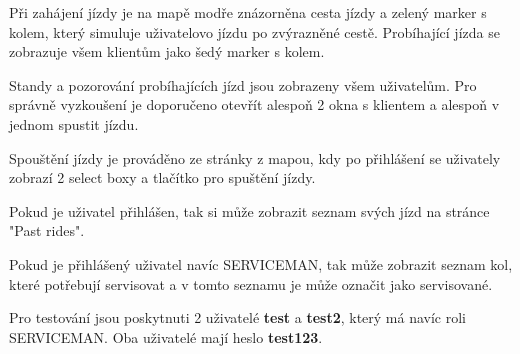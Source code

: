 \documentclass[12pt, letterpaper]{article}
\begin{document}
Při zahájení jízdy je na mapě modře znázorněna cesta jízdy a zelený marker s kolem, který simuluje uživatelovo jízdu
po zvýrazněné cestě. Probíhající jízda se zobrazuje všem klientům jako šedý marker s kolem.

Standy a pozorování probíhajících jízd jsou zobrazeny všem uživatelům. Pro správně vyzkoušení je doporučeno
otevřít alespoň 2 okna s klientem a alespoň v jednom spustit jízdu.

Spouštění jízdy je prováděno ze stránky z mapou, kdy po přihlášení se uživately zobrazí 2 select boxy a tlačítko pro
spuštění jízdy.

Pokud je uživatel přihlášen, tak si může zobrazit seznam svých jízd na stránce "Past rides".

Pokud je přihlášený uživatel navíc SERVICEMAN, tak může zobrazit seznam kol, které potřebují servisovat a v tomto
seznamu je může označit jako servisované.

Pro testování jsou poskytnuti 2 uživatelé \textbf{test} a \textbf{test2}, který má navíc roli SERVICEMAN. 
Oba uživatelé mají heslo \textbf{test123}.
%
\end{document}
